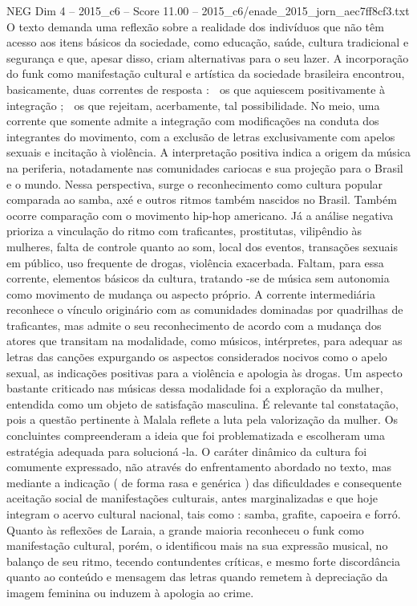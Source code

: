 \begin{textsample}{NEG Dim 4 – 2015\_c6 – Score 11.00 – 2015\_c6/enade\_2015\_jorn\_aec7ff8cf3.txt}
O texto demanda uma reflexão sobre a realidade dos indivíduos que não têm acesso aos itens básicos da sociedade, como educação, saúde, cultura tradicional e segurança e que, apesar disso, criam alternativas para o seu lazer.
A incorporação do funk como manifestação cultural e artística da sociedade brasileira encontrou, basicamente, duas correntes de resposta :  os que aquiescem positivamente à integração ;  os que rejeitam, acerbamente, tal possibilidade.
No meio, uma corrente que somente admite a integração com modificações na conduta dos integrantes do movimento, com a exclusão de letras exclusivamente com apelos sexuais e incitação à violência.
A interpretação positiva indica a origem da música na periferia, notadamente nas comunidades cariocas e sua projeção para o Brasil e o mundo.
Nessa perspectiva, surge o reconhecimento como cultura popular comparada ao samba, axé e outros ritmos também nascidos no Brasil.
Também ocorre comparação com o movimento hip-hop americano.
Já a análise negativa prioriza a vinculação do ritmo com traficantes, prostitutas, vilipêndio às mulheres, falta de controle quanto ao som, local dos eventos, transações sexuais em público, uso frequente de drogas, violência exacerbada.
Faltam, para essa corrente, elementos básicos da cultura, tratando -se de música sem autonomia como movimento de mudança ou aspecto próprio.
A corrente intermediária reconhece o vínculo originário com as comunidades dominadas por quadrilhas de traficantes, mas admite o seu reconhecimento de acordo com a mudança dos atores que transitam na modalidade, como músicos, intérpretes, para adequar as letras das canções expurgando os aspectos considerados nocivos como o apelo sexual, as indicações positivas para a violência e apologia às drogas.
Um aspecto bastante criticado nas músicas dessa modalidade foi a exploração da mulher, entendida como um objeto de satisfação masculina.
É relevante tal constatação, pois a questão pertinente à Malala reflete a luta pela valorização da mulher.
Os concluintes compreenderam a ideia que foi problematizada e escolheram uma estratégia adequada para solucioná -la.
O caráter dinâmico da cultura foi comumente expressado, não através do enfrentamento abordado no texto, mas mediante a indicação ( de forma rasa e genérica ) das dificuldades e consequente aceitação social de manifestações culturais, antes marginalizadas e que hoje integram o acervo cultural nacional, tais como : samba, grafite, capoeira e forró.
Quanto às reflexões de Laraia, a grande maioria reconheceu o funk como manifestação cultural, porém, o identificou mais na sua expressão musical, no balanço de seu ritmo, tecendo contundentes críticas, e mesmo forte discordância quanto ao conteúdo e mensagem das letras quando remetem à depreciação da imagem feminina ou induzem à apologia ao crime.

\end{textsample}
